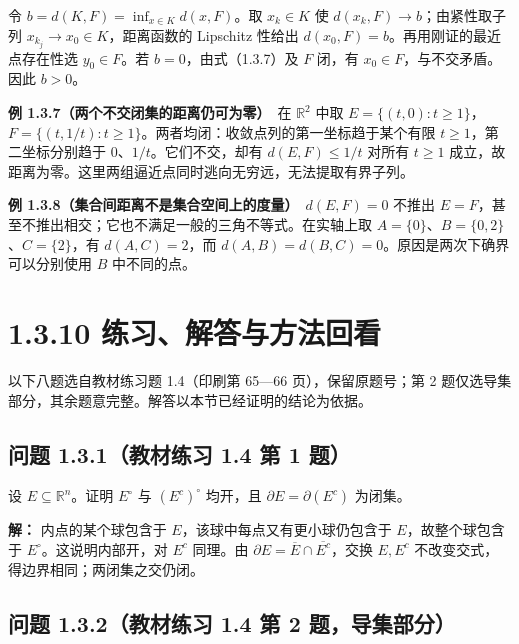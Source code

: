 \documentclass[11pt,a4paper]{article}
\begin{document}
令 \(b=d(K,F)=\inf_{x\in K}d(x,F)\)。取 \(x_k\in K\) 使
\(d(x_k,F)\to b\)；由紧性取子列 \(x_{k_j}\to x_0\in K\)，距离函数的
Lipschitz 性给出 \(d(x_0,F)=b\)。再用刚证的最近点存在性选
\(y_0\in F\)。若 \(b=0\)，由式（1.3.7）及 \(F\) 闭，有
\(x_0\in F\)，与不交矛盾。因此 \(b>0\)。

\textbf{例 1.3.7（两个不交闭集的距离仍可为零）}　在 \(\mathbb R^2\) 中取
\(E=\{(t,0):t\geq1\}\)，\(F=\{(t,1/t):t\geq1\}\)。两者均闭：收敛点列的第一坐标趋于某个有限
\(t\geq1\)，第二坐标分别趋于 \(0\)、\(1/t\)。它们不交，却有
\(d(E,F)\leq1/t\) 对所有 \(t\geq1\)
成立，故距离为零。这里两组逼近点同时逃向无穷远，无法提取有界子列。

\textbf{例 1.3.8（集合间距离不是集合空间上的度量）}　\(d(E,F)=0\) 不推出
\(E=F\)，甚至不推出相交；它也不满足一般的三角不等式。在实轴上取
\(A=\{0\}\)、\(B=\{0,2\}\)、\(C=\{2\}\)，有 \(d(A,C)=2\)，而
\(d(A,B)=d(B,C)=0\)。原因是两次下确界可以分别使用 \(B\) 中不同的点。

\section[\S{}1.3.10
练习、解答与方法回看]{1.3.10
练习、解答与方法回看}\label{ux7ec3ux4e60ux89e3ux7b54ux4e0eux65b9ux6cd5ux56deux770b}

以下八题选自教材练习题 1.4（印刷第 65---66 页），保留原题号；第 2
题仅选导集部分，其余题意完整。解答以本节已经证明的结论为依据。

\subsection{问题 1.3.1（教材练习 1.4 第 1
题）}\label{ux95eeux9898-1.3.1ux6559ux6750ux7ec3ux4e60-1.4-ux7b2c-1-ux9898}

设 \(E\subseteq\mathbb R^n\)。证明 \(E^\circ\) 与 \((E^c)^\circ\)
均开，且 \(\partial E=\partial(E^c)\) 为闭集。

\textbf{解：} 内点的某个球包含于 \(E\)，该球中每点又有更小球仍包含于
\(E\)，故整个球包含于 \(E^\circ\)。这说明内部开，对 \(E^c\) 同理。由
\(\partial E=\overline E\cap\overline{E^c}\)，交换 \(E,E^c\)
不改变交式，得边界相同；两闭集之交仍闭。

\subsection{问题 1.3.2（教材练习 1.4 第 2
题，导集部分）}\label{ux95eeux9898-1.3.2ux6559ux6750ux7ec3ux4e60-1.4-ux7b2c-2-ux9898ux5bfcux96c6ux90e8ux5206}
\end{document}
